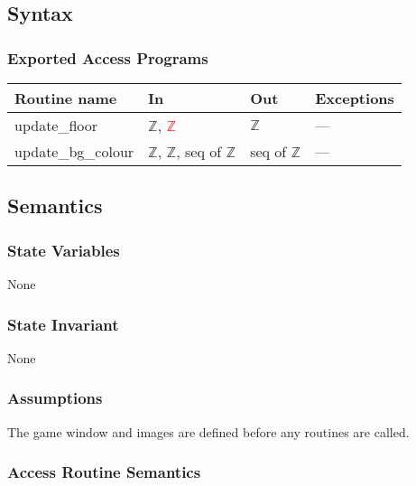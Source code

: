 \documentclass[12pt]{article}
\begin{document}
\subsection* {Syntax}

\subsubsection* {Exported Access Programs}

\begin{tabular}{| l | l | l | l |}
\hline
\textbf{Routine name} & \textbf{In} & \textbf{Out} & \textbf{Exceptions}\\
\hline
    update\_floor & $\mathbb{Z}$, \textcolor{red}{$\mathbb{Z}$} & $\mathbb{Z}$ & ---\\
\hline
    update\_bg\_colour & $\mathbb{Z}$, $\mathbb{Z}$, seq of $\mathbb{Z}$ & seq of $\mathbb{Z}$ & ---\\
\hline
\end{tabular}

\subsection* {Semantics}

\subsubsection* {State Variables}

None

\subsubsection* {State Invariant}

None

\subsubsection* {Assumptions}

The game window and images are defined before any routines are called.

\subsubsection* {Access Routine Semantics}
\end{document}
